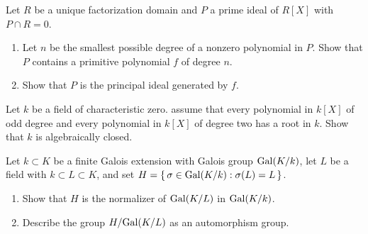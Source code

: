 \begin{problem}
  Let $R$ be a unique factorization domain and $P$ a prime ideal of $R[X]$
  with $P\cap R=0$.
  \begin{enumerate}[label=(\alph*),noitemsep]
  \item Let $n$ be the smallest possible degree of a nonzero polynomial in
    $P$. Show that $P$ contains a primitive polynomial $f$ of degree $n$.
  \item Show that $P$ is the principal ideal generated by $f$.
  \end{enumerate}
\end{problem}
\begin{solution}
\end{solution}

\begin{problem}
  Let $k$ be a field of characteristic zero. assume that every polynomial
  in $k[X]$ of odd degree and every polynomial in $k[X]$ of degree two has
  a root in $k$. Show that $k$ is algebraically closed.
\end{problem}
\begin{solution}
\end{solution}

\begin{problem}
  Let $k\subset K$ be a finite Galois extension with Galois group
  $\operatorname{Gal}(K/k)$, let $L$ be a field with $ k\subset L\subset K$, and set
  $H=\left\{\,\sigma\in\operatorname{Gal}(K/k):\sigma(L)=L\,\right\}$.
  \begin{enumerate}[label=(\alph*),noitemsep]
  \item Show that $H$ is the normalizer of $\operatorname{Gal}(K/L)$ in $\operatorname{Gal}(K/k)$.
  \item Describe the group $H/{\operatorname{Gal}(K/L)}$ as an automorphism group.
  \end{enumerate}
\end{problem}
\begin{solution}
\end{solution}

